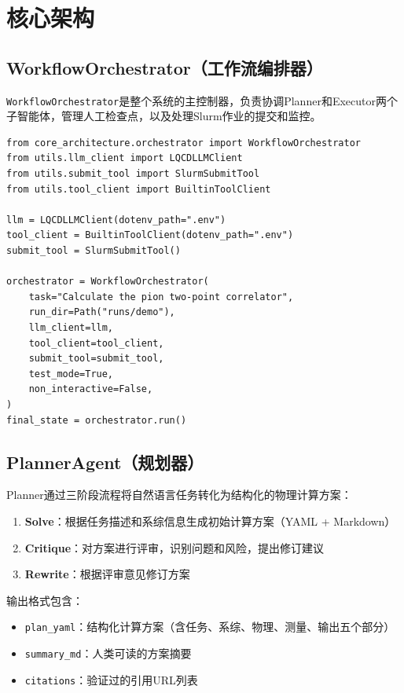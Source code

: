 \documentclass[12pt,a4paper]{ctexart}
\begin{document}
\section{核心架构}

\subsection{WorkflowOrchestrator（工作流编排器）}

\texttt{WorkflowOrchestrator}是整个系统的主控制器，负责协调Planner和Executor两个子智能体，管理人工检查点，以及处理Slurm作业的提交和监控。

\begin{lstlisting}[caption={WorkflowOrchestrator 使用示例}, label={lst:orchestrator}]
from core_architecture.orchestrator import WorkflowOrchestrator
from utils.llm_client import LQCDLLMClient
from utils.submit_tool import SlurmSubmitTool
from utils.tool_client import BuiltinToolClient

llm = LQCDLLMClient(dotenv_path=".env")
tool_client = BuiltinToolClient(dotenv_path=".env")
submit_tool = SlurmSubmitTool()

orchestrator = WorkflowOrchestrator(
    task="Calculate the pion two-point correlator",
    run_dir=Path("runs/demo"),
    llm_client=llm,
    tool_client=tool_client,
    submit_tool=submit_tool,
    test_mode=True,
    non_interactive=False,
)
final_state = orchestrator.run()
\end{lstlisting}

\subsection{PlannerAgent（规划器）}

Planner通过三阶段流程将自然语言任务转化为结构化的物理计算方案：

\begin{enumerate}[leftmargin=*]
    \item \textbf{Solve}：根据任务描述和系综信息生成初始计算方案（YAML + Markdown）
    \item \textbf{Critique}：对方案进行评审，识别问题和风险，提出修订建议
    \item \textbf{Rewrite}：根据评审意见修订方案
\end{enumerate}

输出格式包含：
\begin{itemize}[leftmargin=*]
    \item \texttt{plan\_yaml}：结构化计算方案（含任务、系综、物理、测量、输出五个部分）
    \item \texttt{summary\_md}：人类可读的方案摘要
    \item \texttt{citations}：验证过的引用URL列表
\end{itemize}
\end{document}
